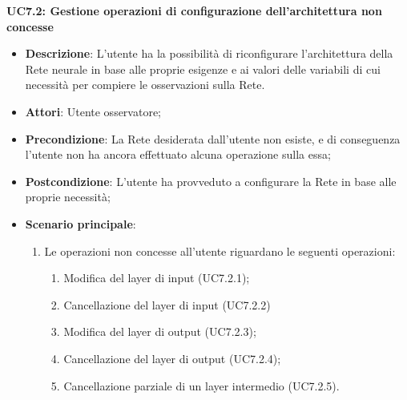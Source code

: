 \textbf{UC7.2: Gestione operazioni di configurazione dell'architettura non concesse}
\label{UC7.2: Gestione operazioni di configurazione dell'architettura non concesse}
\noindent
\begin{itemize}
\item \textbf{Descrizione}: L'utente ha la possibilit\`a di riconfigurare l'architettura della Rete neurale in base alle proprie esigenze e ai valori delle variabili di cui necessit\`a per compiere le osservazioni sulla Rete.
\item \textbf{Attori}: Utente osservatore;
\item \textbf{Precondizione}: La Rete desiderata dall'utente non esiste, e di conseguenza l'utente non ha ancora effettuato alcuna operazione sulla essa;
\item \textbf{Postcondizione}: L'utente ha provveduto a configurare la Rete in base alle proprie necessit\`a;
\item \textbf{Scenario principale}:
\begin{enumerate}
\item Le operazioni non concesse all'utente riguardano le seguenti operazioni:
\begin{enumerate}
\item Modifica del layer di input (UC7.2.1);
\item Cancellazione del layer di input (UC7.2.2)
\item Modifica del layer di output (UC7.2.3);
\item Cancellazione del layer di output (UC7.2.4);
\item Cancellazione parziale di un layer intermedio (UC7.2.5).
\end{enumerate}
\end{enumerate}
\end{itemize}

